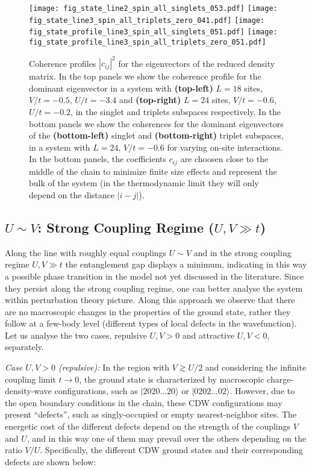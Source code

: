 \documentclass[prb,reprint,showpacs,twocolumn,superscriptaddress]{revtex4-2}
\begin{document}
 \begin{figure}
 \texttt{[image: fig\_state\_line2\_spin\_all\_singlets\_053.pdf]}
 \texttt{[image: fig\_state\_line3\_spin\_all\_triplets\_zero\_041.pdf]}
\texttt{[image: fig\_state\_profile\_line3\_spin\_all\_singlets\_051.pdf]}
\texttt{[image: fig\_state\_profile\_line3\_spin\_all\_triplets\_zero\_051.pdf]}
\caption{ 
Coherence profiles $|c_{ij}|^2$ for the eigenvectors of the reduced density matrix. In the top panels we show the coherence profile for the dominant eigenvector in a system with 
\textbf{(top-left)} $L=18$ sites, $V/t=-0.5$, $U/t=-3.4$ and
\textbf{(top-right)} $L=24$ sites, $V/t=-0.6$,  $U/t=-0.2$, in the singlet and triplets subspaces respectively.
In the bottom panels we show the coherences for the dominant eigenvectors of the 
\textbf{(bottom-left)} singlet and \textbf{(bottom-right)} triplet subspaces, in a 
system with  $L=24$, $V/t=-0.6$ for varying on-site interactions.
In the bottom panels, the coefficients $c_{ij}$ are choosen close to the middle of the chain to minimize finite size effects and represent the bulk of the system (in the thermodynamic limit they will only depend on the distance $|i-j|$).}
\label{fig.dom.eigenvector}
\end{figure}

\subsection{$U\sim V $: Strong Coupling Regime ($U,V \gg t $)}
\label{subsec.u.sim.v}

Along the line with roughly equal couplings $U\sim V$ and in the strong coupling regime $U,V \gg t $ the entanglement gap displays a minimum, indicating in this way a possible phase transition in the model not yet discussed in the literature.  Since they persist along the strong coupling regime, one can better analyse the system within perturbation theory picture. %
Along this approach we observe that there are no macroscopic changes in the properties of the ground state, rather they follow at a few-body level (different types of local defects in the wavefunction). 
Let us analyse the two cases, repulsive $U,V>0$ and attractive $U,V<0$, separately.

\textit{Case $U,V>0$ (repulsive):} In the region  with $V \gtrsim U/2$ and considering the infinite coupling limit $t \rightarrow 0$, the ground state is characterized by macroscopic charge-density-wave configurations, such as $|2020...20\rangle$ or $|0202...02\rangle$. However, due to the open boundary conditions in the chain, these CDW configurations may present ``defects'', such as singly-occupied or empty nearest-neighbor sites. The energetic cost of the different defects depend on the strength of the couplings $V$ and $U$, and in this way one of them may prevail over the others depending on the ratio $V/U$. Specifically, the different CDW ground states and their corresponding defects 
are shown below:
\end{document}
